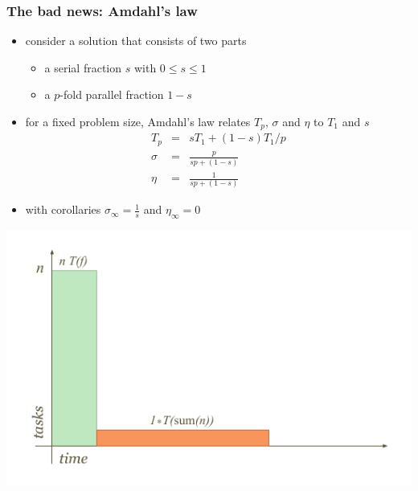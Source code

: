 %
\begin{frame}[fragile]
%
  \frametitle{The bad news: Amdahl's law}
%
  \begin{minipage}{.55\linewidth}
    \begin{itemize}
%
    \item consider a solution that consists of two parts
      \begin{itemize}
      \item a serial fraction $s$ with $0 \leq s \leq 1$
      \item a $p$-fold parallel fraction $1-s$
      \end{itemize}
%
    \item for a fixed problem size, Amdahl's law relates $T_{p}$, $\sigma$ and $\eta$ to
      $T_{1}$ and $s$
      \begin{eqnarray*}
        T_{p}  & = & s T_{1} + (1-s) T_{1} / p \\
        \sigma & = & \frac{p}{sp + (1-s)} \\
        \eta & = & \frac{1}{sp + (1-s)}
      \end{eqnarray*}
%
    \item with corollaries $\sigma_{\infty} = \frac{1}{s}$ and $\eta_{\infty} = 0$
    \end{itemize}
  \end{minipage}
  \hfill
  \begin{minipage}{.40\linewidth}
    \includegraphics[width=1.2\linewidth]{figures/reduction-parallel-work.pdf}
    \vspace{2em}


\end{minipage}
\end{frame}
